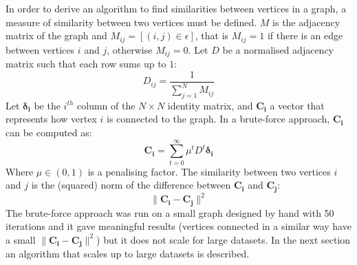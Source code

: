 \documentclass[12pt]{report}
\begin{document}
In order to derive an algorithm to find similarities between vertices in a graph,
a measure of similarity between two vertices must be defined. $M$ is the adjacency
matrix of the graph and $M_{i j} = [(i,j) \in \epsilon]$, that is $M_{i j} = 1$
if there is an edge between vertices $i$ and $j$, otherwise $M_{i j} = 0$. Let
$D$ be a normalised adjacency matrix such that each row sums up to $1$:
%
\begin{equation}
D_{i j} = \frac{1}{\sum_{j=1}^N M_{ij}}
\end{equation}
%
Let $\mathbf{\delta_i}$ be the $i^{th}$ column of the $N \times N$ identity matrix,
and $\mathbf{C_i}$ a vector that represents how vertex $i$ is connected to the graph.
In a brute-force approach, $\mathbf{C_i}$ can be computed as:
%
\begin{equation}
\label{eq:brute-ci}
\mathbf{C_i} = \sum_{t=0}^\infty \mu^t D^t \mathbf{\delta_i}
\end{equation}
%
Where $\mu \in (0,1)$ is a penalising factor. The similarity between two vertices
$i$ and $j$ is the (squared) norm of the difference between $\mathbf{C_i}$ and
$\mathbf{C_j}$:
%
\begin{equation}
\|\mathbf{C_i} - \mathbf{C_j}\|^2
\end{equation}
%
The brute-force approach was run on a small graph designed by hand with 50 iterations
and it gave meaningful results (vertices connected in a similar way have a small
$\|\mathbf{C_i} - \mathbf{C_j}\|^2$) but it does not scale for large datasets. In
the next section an algorithm that scales up to large datasets is described.

%
%
\end{document}
